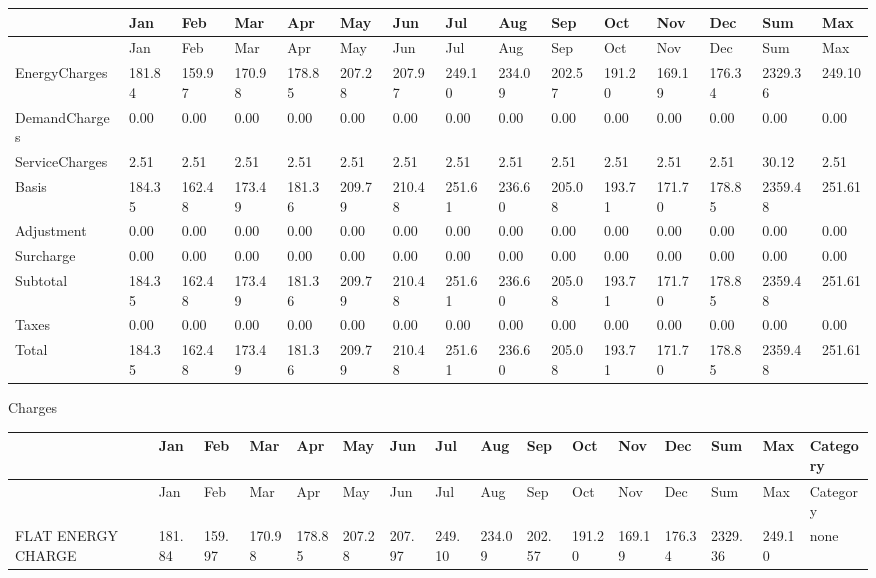{\tiny
\begin{longtable}[c]{>{\raggedright}p{0.4in}>{\raggedright}p{0.4in}>{\raggedright}p{0.4in}>{\raggedright}p{0.4in}>{\raggedright}p{0.4in}>{\raggedright}p{0.4in}>{\raggedright}p{0.4in}>{\raggedright}p{0.4in}>{\raggedright}p{0.4in}>{\raggedright}p{0.4in}>{\raggedright}p{0.4in}>{\raggedright}p{0.4in}>{\raggedright}p{0.4in}>{\raggedright}p{0.4in}>{\raggedright}p{0.4in}}
\toprule
~ & Jan & Feb & Mar & Apr & May & Jun & Jul & Aug & Sep & Oct & Nov & Dec & Sum & Max \tabularnewline
\midrule
\endfirsthead

\toprule
~ & Jan & Feb & Mar & Apr & May & Jun & Jul & Aug & Sep & Oct & Nov & Dec & Sum & Max \tabularnewline
\midrule
\endhead

EnergyCharges & 181.84 & 159.97 & 170.98 & 178.85 & 207.28 & 207.97 & 249.10 & 234.09 & 202.57 & 191.20 & 169.19 & 176.34 & 2329.36 & 249.10 \tabularnewline
DemandCharges & 0.00 & 0.00 & 0.00 & 0.00 & 0.00 & 0.00 & 0.00 & 0.00 & 0.00 & 0.00 & 0.00 & 0.00 & 0.00 & 0.00 \tabularnewline
ServiceCharges & 2.51 & 2.51 & 2.51 & 2.51 & 2.51 & 2.51 & 2.51 & 2.51 & 2.51 & 2.51 & 2.51 & 2.51 & 30.12 & 2.51 \tabularnewline
Basis & 184.35 & 162.48 & 173.49 & 181.36 & 209.79 & 210.48 & 251.61 & 236.60 & 205.08 & 193.71 & 171.70 & 178.85 & 2359.48 & 251.61 \tabularnewline
Adjustment & 0.00 & 0.00 & 0.00 & 0.00 & 0.00 & 0.00 & 0.00 & 0.00 & 0.00 & 0.00 & 0.00 & 0.00 & 0.00 & 0.00 \tabularnewline
Surcharge & 0.00 & 0.00 & 0.00 & 0.00 & 0.00 & 0.00 & 0.00 & 0.00 & 0.00 & 0.00 & 0.00 & 0.00 & 0.00 & 0.00 \tabularnewline
Subtotal & 184.35 & 162.48 & 173.49 & 181.36 & 209.79 & 210.48 & 251.61 & 236.60 & 205.08 & 193.71 & 171.70 & 178.85 & 2359.48 & 251.61 \tabularnewline
Taxes & 0.00 & 0.00 & 0.00 & 0.00 & 0.00 & 0.00 & 0.00 & 0.00 & 0.00 & 0.00 & 0.00 & 0.00 & 0.00 & 0.00 \tabularnewline
Total & 184.35 & 162.48 & 173.49 & 181.36 & 209.79 & 210.48 & 251.61 & 236.60 & 205.08 & 193.71 & 171.70 & 178.85 & 2359.48 & 251.61 \tabularnewline
\bottomrule
\end{longtable}}

Charges

{\tiny
\begin{longtable}[c]{>{\raggedright}p{0.37in}>{\raggedright}p{0.37in}>{\raggedright}p{0.37in}>{\raggedright}p{0.37in}>{\raggedright}p{0.37in}>{\raggedright}p{0.37in}>{\raggedright}p{0.37in}>{\raggedright}p{0.37in}>{\raggedright}p{0.37in}>{\raggedright}p{0.37in}>{\raggedright}p{0.37in}>{\raggedright}p{0.37in}>{\raggedright}p{0.37in}>{\raggedright}p{0.37in}>{\raggedright}p{0.37in}>{\raggedright}p{0.37in}}
\toprule
~ & Jan & Feb & Mar & Apr & May & Jun & Jul & Aug & Sep & Oct & Nov & Dec & Sum & Max & Category \tabularnewline
\midrule
\endfirsthead

\toprule
~ & Jan & Feb & Mar & Apr & May & Jun & Jul & Aug & Sep & Oct & Nov & Dec & Sum & Max & Category \tabularnewline
\midrule
\endhead

FLAT ENERGY CHARGE & 181.84 & 159.97 & 170.98 & 178.85 & 207.28 & 207.97 & 249.10 & 234.09 & 202.57 & 191.20 & 169.19 & 176.34 & 2329.36 & 249.10 & none \tabularnewline
\bottomrule
\end{longtable}}

